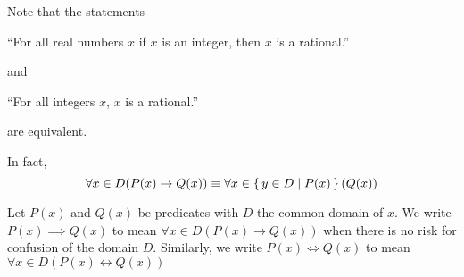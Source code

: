 






Note that the statements
\begin{center}
	``For all real numbers $x$ if $x$ is an integer, then $x$ is a rational.''
\end{center}
and
\begin{center}
	``For all integers $x$, $x$ is a rational.''
\end{center}
are equivalent.

In fact, \[\forall x\in D(P(x)\rightarrow Q(x) )\equiv \forall x\in \left\{\,y\in D\mid P(x)\,\right\}( Q(x) )\]


Let $P(x)$ and $Q(x)$ be predicates with $D$ the common domain of $x$.
We write $P(x)\implies Q(x)$ to mean $\forall x\in D( P(x)\rightarrow Q(x))$ when there is no risk for confusion of the domain $D$.
Similarly, we write $P(x)\iff Q(x)$ to mean $\forall x\in D( P(x)\leftrightarrow Q(x))$
